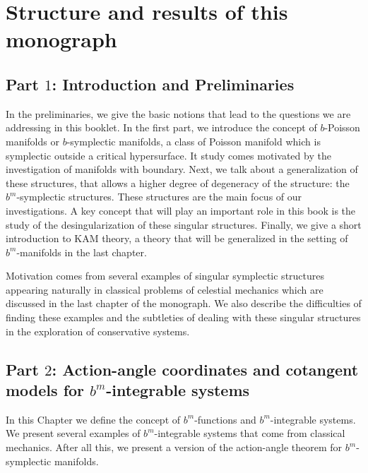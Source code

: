 \section{Structure and results of this monograph}

\subsection{Part $1$: Introduction and Preliminaries}

In the preliminaries, we give the basic notions that lead to the questions we are addressing in this booklet. In the first part, we introduce the concept of $b$-Poisson manifolds or $b$-symplectic manifolds, a class of Poisson manifold which is symplectic outside a critical hypersurface. It study comes motivated by the investigation of manifolds with boundary. Next, we talk about a generalization of these structures, that allows a higher degree of degeneracy of the structure: the $b^m$-symplectic structures. These structures are the main focus of our investigations. A key concept that will play an important role in this book is the study of the desingularization of these singular structures. Finally, we give a short introduction to KAM theory, a theory that will be generalized in the setting of $b^m$-manifolds in the last chapter.



Motivation comes from several examples of singular symplectic structures appearing naturally in classical problems of celestial mechanics which are discussed in the last chapter of the monograph. We also describe the difficulties of finding these examples and the subtleties of dealing with these singular structures in the exploration of conservative systems.









\subsection{Part $2$: Action-angle coordinates and cotangent models for $b^m$-integrable systems}

In this Chapter we define the concept of $b^m$-functions and $b^m$-integrable systems. We present several examples of $b^m$-integrable systems that come from classical mechanics. After all this, we present a version of the action-angle theorem for $b^m$-symplectic manifolds.

